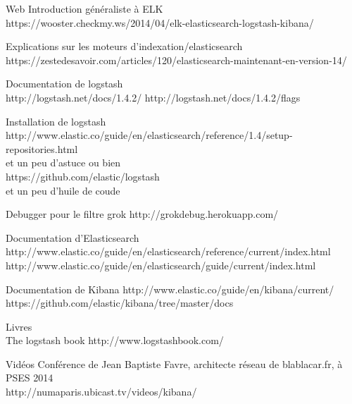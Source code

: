 Web
Introduction généraliste à ELK \\

https://wooster.checkmy.ws/2014/04/elk-elasticsearch-logstash-kibana/

Explications sur les moteurs d'indexation/elasticsearch\\
https://zestedesavoir.com/articles/120/elasticsearch-maintenant-en-version-14/



Documentation de logstash\\
http://logstash.net/docs/1.4.2/
http://logstash.net/docs/1.4.2/flags

Installation de logstash
http://www.elastic.co/guide/en/elasticsearch/reference/1.4/setup-repositories.html
\\ et un peu d'astuce ou bien \\
https://github.com/elastic/logstash
\\ et un peu d'huile de coude


Debugger pour le filtre grok
http://grokdebug.herokuapp.com/


Documentation d'Elasticsearch\\
http://www.elastic.co/guide/en/elasticsearch/reference/current/index.html\\
http://www.elastic.co/guide/en/elasticsearch/guide/current/index.html



Documentation de Kibana
http://www.elastic.co/guide/en/kibana/current/
https://github.com/elastic/kibana/tree/master/docs


Livres\\
The logstash book
http://www.logstashbook.com/


Vidéos
Conférence de Jean Baptiste Favre, architecte réseau de blablacar.fr, à PSES 2014\\
http://numaparis.ubicast.tv/videos/kibana/

